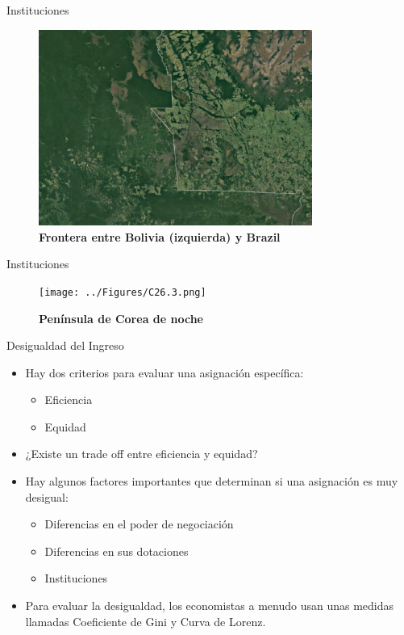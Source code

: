 \documentclass{beamer}
\begin{document}
\begin{frame}{Instituciones}
    
    \begin{figure}[H]
        \begin{center}
            \includegraphics[width=0.8\textwidth]{../Figures/C26.2.png}
        \end{center}
        \caption{\textbf{Frontera entre Bolivia (izquierda) y Brazil}}
    \end{figure}
\end{frame}


\begin{frame}{Instituciones}
    \begin{figure}[H]
    \begin{center}
    \texttt{[image: ../Figures/C26.3.png]}
    \end{center}
    \caption{\textbf{Península de Corea de noche}}
    \label{fig:korea}
    \end{figure}
\end{frame}

\begin{frame}{Desigualdad del Ingreso}
        \begin{itemize}
            \item Hay dos criterios para evaluar una asignación específica: 
            \begin{itemize}
                \item Eficiencia
                \item Equidad
            \end{itemize}
            \item ¿Existe un trade off entre eficiencia y equidad?
            \item Hay algunos factores importantes que determinan si una asignación es muy desigual:
            \begin{itemize}
                \item Diferencias en el poder de negociación
                \item Diferencias en sus dotaciones
                \item Instituciones
            \end{itemize}
            \item Para evaluar la desigualdad, los economistas a menudo usan unas medidas llamadas Coeficiente de Gini y Curva de Lorenz.
        \end{itemize}
\end{frame}
\end{document}
